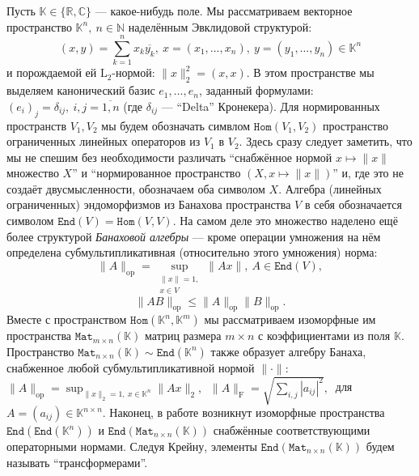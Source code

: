 \documentclass[14pt,a4paper]{extarticle}
\theoremstyle{definition}
\begin{document}
Пусть \( \mathbb{K}\in \{ \mathbb{R}, \mathbb{C} \} \)
--- какое-нибудь поле.
Мы рассматриваем векторное пространство \( \mathbb{K}^n,\ n\in \mathbb{N} \)
наделённым Эвклидовой структурой:
    \[
        (x, y){=}\sum_{k=1}^n x_k\overline{y_k},
        \ x{=}(x_1,\ldots, x_n),
        \ y=(y_1,\ldots, y_n)
        \in \mathbb{K}^n
        \]
    и порождаемой ей \( \mathrm{L}_2 \)-нормой:
    \(
        \|x\|_2^2{=}(x,x).
        \)
В этом пространстве мы выделяем канонический базис \( e_1, \ldots, e_n \),
        заданный формулами:
        \( {(e_i)}_j = \delta_{ij},\ i,j=\overline{1,n} \)
    (где \(\delta_{ij} \) --- ``Delta'' Кронекера).
Для нормированных пространств \( V_1, V_2 \) 
    мы будем обозначать симвлом \( \mathtt{Hom}(V_1, V_2) \)
    пространство ограниченных линейных операторов
    из \( V_1 \) в \( V_2 \).
Здесь сразу следует заметить, что мы не спешим без необходимости различать
``снабжённое нормой \(x\mapsto \|x\| \) множество \( X \)''
и ``нормированное пространство \( (X, x\mapsto \|x\|) \)''
и, где это не создаёт двусмысленности, обозначаем оба символом \( X \).
Алгебра (линейных ограниченных) эндоморфизмов
    из Банахова пространства \( V \)
    в себя обозначается символом \( \mathtt{End}(V) = \mathtt{Hom}(V, V) \).
На самом деле это множество наделено ещё более структурой \emph{Банаховой
  алгебры} --- кроме операции умножения на нём определена суб\-мульти\-пликатив\-ная
(относительно этого умножения) норма:
    \[
        \|A\|_{\mathrm{op}} =
        \sup_{
            \substack{\|x\|=1,\\ x\in V}
        } \|A x\|,\ A\in \mathtt{End}(V),
        \]
     \[
       \|AB\|_{\mathrm{op}} \leq \|A\|_{\mathrm{op}} \|B\|_{\mathrm{op}}.
        \]
Вместе с пространством \( \mathtt{Hom}(\mathbb{K}^n, \mathbb{K}^m) \)
    мы рассматриваем изоморфные им пространства \(
    \mathtt{Mat}_{m{\times}n}(\mathbb{K}) \)
    матриц размера \( m{\times}n \)
    с коэффициентами из поля \( \mathbb{K} \).
Пространство \( \mathtt{Mat}_{n{\times}n}(\mathbb{K})\sim
\mathtt{End}(\mathbb{K}^n) \)
также образует алгебру Банаха, снабженное любой суб\-мульти\-пликатив\-ной нормой
    \( \|\cdot\| \):
    \( \|A\|_{\mathrm{op}} = \sup_{\|x\|_2=1,\ x\in \mathbb{K}^n} \|A x\|_2,\ \)
    \( \|A\|_{\mathrm{F}} = \sqrt{\sum_{i,j} |a_{ij}|^2},\ \)
    для 
    \( A{=}(a_{ij})\in\mathbb{K}^{n\times n} \).
Наконец, в работе возникнут изоморфные пространства
    \( \mathtt{End}(\mathtt{End}(\mathbb{K}^n)) \) и \(
    \mathtt{End}(\mathtt{Mat}_{n{\times}n}(\mathbb{K})) \)
    снабжённые соответствующими операторными нормами.
Следуя Крейну, элементы \( \mathtt{End}(\mathtt{Mat}_{n{\times}n}(\mathbb{K})) \)
    будем называть ``трансформерами''.
\end{document}
